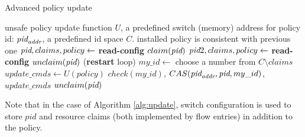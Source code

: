 \documentclass[conference]{sigcomm-alternate}
\newcommand{\claimcheck}{check\xspace}
\newcommand{\addr}{\emph{addr}\xspace}
\newcommand{\pid}{\emph{pid}\xspace}
\newcommand{\ufunc}{U} %
\begin{document}
\begin{algorithm}[h]
    \caption{Advanced policy update}
    \label{alg:update}
    \begin{algorithmic}[1]
        \Require unsafe policy update function $\ufunc$, a predefined switch (memory) address for policy id: $\pid_{\addr}$, a predefined id space $C$.
    \Ensure installed policy is consistent with previous one
 		\Repeat
		 	\State $\pid,claims,policy\gets$ \textbf{read-config} %
 			\State $claim(\pid)$
 			\State $\pid 2,claims,policy\gets$ \textbf{read-config} %
 			\If {$\pid\neq \pid 2$}
	 			\State $unclaim(\pid)$
 				 (\textbf{restart} loop)
 			\EndIf
 			\State $my\_id\gets$ choose a number from $C\setminus claims$
 			\State $update\_cmds\gets \ufunc(policy)$
 			\startTxn
 				\State $\claimcheck(my\_id)$,
	 			\State $CAS(\pid_{\addr}, \pid,my\_id)$,
	 			\State $update\_cmds$ %
 			\endTxn
	 		\State $unclaim(\pid)$
			\Return

    \end{algorithmic}
\end{algorithm}

Note that in the case of Algorithm \ref{alg:update}, switch configuration is used to store $pid$ and resource claims (both implemented by flow entries) in addition to the policy.


%
%
%
\end{document}
